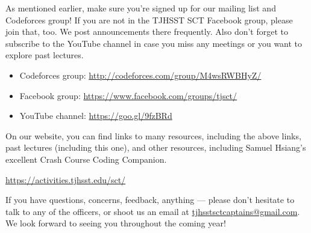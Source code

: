 \documentclass{article}
\begin{document}
As mentioned earlier, make sure you're signed up for our mailing list and Codeforces group! If you are not in the TJHSST SCT Facebook group, please join that, too. We post announcements there frequently. Also don't forget to subscribe to the YouTube channel in case you miss any meetings or you want to explore past lectures. 


\begin{itemize}
    \item Codeforces group: \url{http://codeforces.com/group/M4wsRWBHyZ/}
    \item Facebook group: \url{https://www.facebook.com/groups/tjsct/}
    \item YouTube channel:
    \url{https://goo.gl/9fzBRd}
\end{itemize}

On our website, you can find links to many resources, including the above links, past lectures (including this one), and other resources, including Samuel Hsiang's excellent Crash Course Coding Companion.

\begin{center}
\Large{\url{https://activities.tjhsst.edu/sct/}}
\end{center}

If you have questions, concerns, feedback, anything — please don't hesitate to talk to any of the officers, or shoot us an email at \url{tjhsstsctcaptains@gmail.com}. We look forward to seeing you throughout the coming year!
\end{document}
